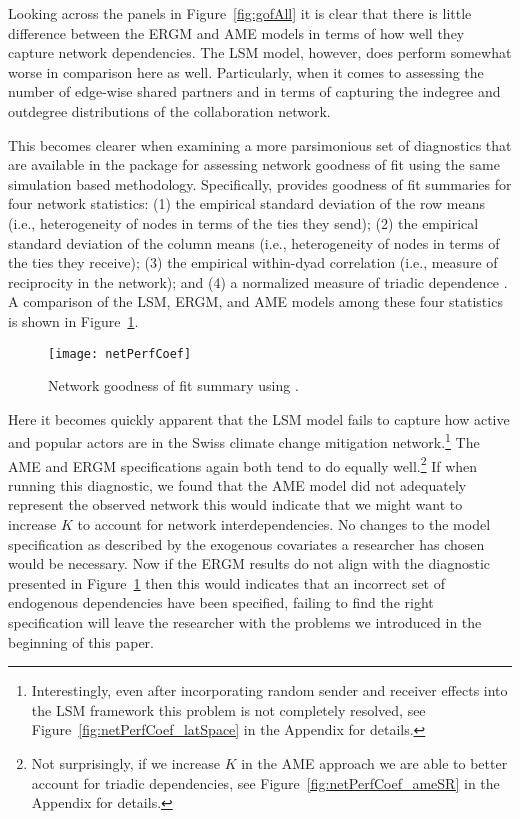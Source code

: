 Looking across the panels in Figure~\ref{fig:gofAll} it is clear that there is little difference between the ERGM and AME models in terms of how well they capture network dependencies. The LSM model, however, does perform somewhat worse in comparison here as well. Particularly, when it comes to assessing the number of edge-wise shared partners and in terms of capturing the indegree and outdegree distributions of the collaboration network. 

This becomes clearer when examining a more parsimonious set of diagnostics that are available in the  package for assessing network goodness of fit using the same simulation based methodology. Specifically,  provides goodness of fit summaries for four network statistics: (1) the empirical standard deviation of the row means (i.e., heterogeneity of nodes in terms of the ties they send); (2) the empirical standard deviation of the column means (i.e., heterogeneity of nodes in terms of the ties they receive); (3) the empirical within-dyad correlation (i.e., measure of reciprocity in the network); and (4) a normalized measure of triadic dependence \citep{hoff:etal:2015}. A comparison of the LSM, ERGM, and AME models among these four statistics is shown in Figure~\ref{fig:ergmAmePerf}.

\begin{figure}[ht]
	\centering
	\texttt{[image: netPerfCoef]}
	\caption{Network goodness of fit summary using .}
	\label{fig:ergmAmePerf}
\end{figure}
\FloatBarrier

Here it becomes quickly apparent that the LSM model fails to capture how active and popular actors are in the Swiss climate change mitigation network.\footnote{Interestingly, even after incorporating random sender and receiver effects into the LSM framework this problem is not completely resolved, see Figure~\ref{fig:netPerfCoef_latSpace} in the Appendix for details.} The AME and ERGM specifications again both tend to do equally well.\footnote{Not surprisingly, if we increase $K$ in the AME approach we are able to better account for triadic dependencies, see Figure~\ref{fig:netPerfCoef_ameSR} in the Appendix for details.} If when running this diagnostic, we found that the AME model did not adequately represent the observed network this would indicate that we might want to increase $K$ to account for network interdependencies. No changes to the model specification as described by the exogenous covariates a researcher has chosen would be necessary. Now if the ERGM results do not align with the diagnostic presented in Figure~\ref{fig:ergmAmePerf} then this would indicates that an incorrect set of endogenous dependencies have been specified, failing to find the right specification will leave the researcher with the problems we introduced in the beginning of this paper.

